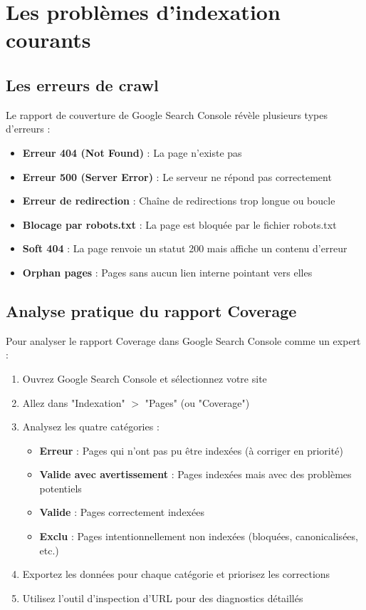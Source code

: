 \documentclass[12pt,a4paper,twoside]{report}
\newcommand{\important}[1]{\textbf{\textcolor{googlered}{#1}}}
\begin{document}
\section{Les problèmes d'indexation courants}

\subsection{Les erreurs de crawl}

Le rapport de couverture de Google Search Console révèle plusieurs types d'erreurs :

\begin{itemize}
    \item \important{Erreur 404 (Not Found)} : La page n'existe pas
    \item \important{Erreur 500 (Server Error)} : Le serveur ne répond pas correctement
    \item \important{Erreur de redirection} : Chaîne de redirections trop longue ou boucle
    \item \important{Blocage par robots.txt} : La page est bloquée par le fichier robots.txt
    \item \important{Soft 404} : La page renvoie un statut 200 mais affiche un contenu d'erreur
    \item \important{Orphan pages} : Pages sans aucun lien interne pointant vers elles
\end{itemize}

\subsection{Analyse pratique du rapport Coverage}

Pour analyser le rapport Coverage dans Google Search Console comme un expert :

\begin{enumerate}
    \item Ouvrez Google Search Console et sélectionnez votre site
    \item Allez dans "Indexation" $>$ "Pages" (ou "Coverage")
    \item Analysez les quatre catégories :
    \begin{itemize}
        \item \textbf{Erreur} : Pages qui n'ont pas pu être indexées (à corriger en priorité)
        \item \textbf{Valide avec avertissement} : Pages indexées mais avec des problèmes potentiels
        \item \textbf{Valide} : Pages correctement indexées
        \item \textbf{Exclu} : Pages intentionnellement non indexées (bloquées, canonicalisées, etc.)
    \end{itemize}
    \item Exportez les données pour chaque catégorie et priorisez les corrections
    \item Utilisez l'outil d'inspection d'URL pour des diagnostics détaillés
\end{enumerate}
\end{document}
